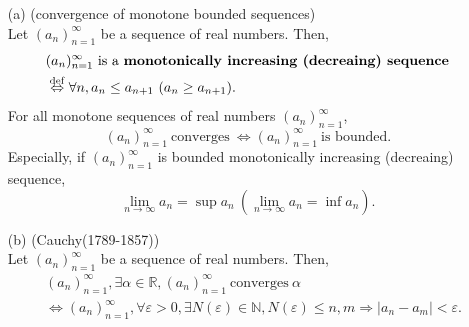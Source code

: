 \begin{frame}[fragile]
  \begin{proper}
    \begin{enumerate}
      \item[(a)] (convergence of monotone bounded sequences)\\
      Let $(a_n)_{n=1}^\infty$ be a sequence of real numbers. Then,
      \begin{align*}
        & (a_n)_{n=1}^\infty\ \mbox{is a {\bf monotonically increasing (decreaing) sequence}}\\
        & \overset{\mathrm{def}}{\Leftrightarrow}\forall n, a_n\leq a_{n+1}\ (a_n\geq a_{n+1}).
      \end{align*}
      For all monotone sequences of real numbers $(a_n)_{n=1}^\infty$,
      \[
        (a_n)_{n=1}^\infty\ \mbox{converges}\ \Leftrightarrow (a_n)_{n=1}^\infty\ \mbox{is bounded}.
      \]
      Especially, if $(a_n)_{n=1}^\infty$ is bounded monotonically increasing (decreaing) sequence,
      \[
        \lim_{n\to\infty}a_n = \sup a_n\ (\lim_{n\to\infty}a_n = \inf a_n).
      \]
    \end{enumerate}
  \end{proper}
\end{frame}

\begin{frame}[fragile]
  \begin{proper}
    \begin{enumerate}
      \item[(b)] (Cauchy(1789-1857))\\
      Let $(a_n)_{n=1}^\infty$ be a sequence of real numbers. Then,
      \begin{align*}
        & (a_n)_{n=1}^\infty, \exists\alpha\in\mathbb{R}, (a_n)_{n=1}^\infty\ \mbox{converges}\ \alpha\\
        & \Leftrightarrow(a_n)_{n=1}^\infty, \forall\varepsilon >0, \exists N(\varepsilon)\in\mathbb{N},
        N(\varepsilon)\leq n, m\Rightarrow|a_n-a_m|<\varepsilon.
      \end{align*}
    \end{enumerate}
  \end{proper}
\end{frame}

